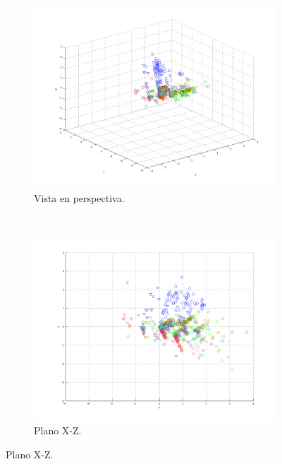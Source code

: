 \documentclass[informe.tex]{subfiles}
\begin{document}
	\begin{figure}[H]
        \centering
        \hspace*{-6.5cm}
        \begin{subfigure}[b]{0.49\textwidth}
                \includegraphics[width=\textwidth]{graficos/fold1_criterioParadap_reglas_alpha0_rep3_0P.png}
                \caption{Vista en perspectiva.}
        \end{subfigure}%
        ~
        \begin{subfigure}[b]{0.49\textwidth}
                \includegraphics[width=\textwidth]{graficos/fold1_criterioParadap_reglas_alpha0_rep3_1XZ.png}
                \caption{Plano X-Z.}
        \end{subfigure}
        

\end{figure}
\end{document}
